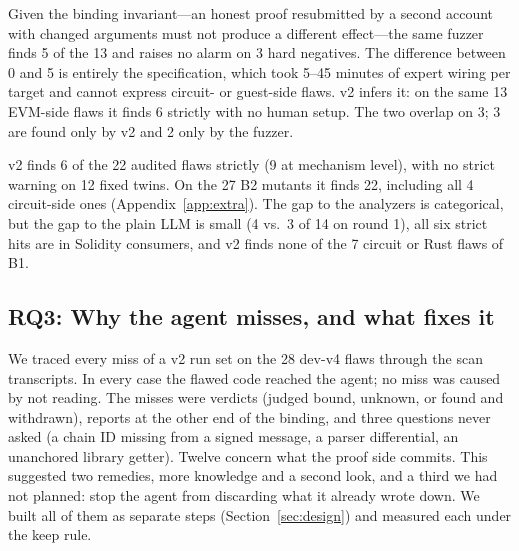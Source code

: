 Given the binding invariant---an honest proof resubmitted by a second account
with changed arguments must not produce a different effect---the same
fuzzer finds 5 of the 13 and raises no alarm on 3 hard negatives. The
difference between 0 and 5 is entirely the specification, which took 5--45
minutes of expert wiring per target and cannot express circuit- or
guest-side flaws. \tool{} v2 infers it: on the same 13 EVM-side flaws it
finds 6 strictly with no human setup. The two overlap on 3; 3 are found only
by v2 and 2 only by the fuzzer.

v2 finds 6 of the 22 audited flaws strictly (9 at mechanism level), with no
strict warning on 12 fixed twins. On the 27 B2 mutants it finds 22, including
all 4 circuit-side ones (Appendix~\ref{app:extra}). The gap to the analyzers is
categorical, but the gap to the plain LLM is small (4 vs.\ 3 of 14 on round
1), all six strict hits are in Solidity consumers, and v2 finds none of the 7
circuit or Rust flaws of B1.


\subsection{RQ3: Why the agent misses, and what fixes it}\label{sec:eval-anatomy}

We traced every miss of a v2 run set on the 28 dev-v4 flaws through the scan
transcripts. In every case the flawed code reached the agent; no miss was
caused by not reading. The misses were verdicts (judged bound, unknown, or
found and withdrawn), reports at the other end of the binding, and three
questions never asked (a chain ID missing from a signed message, a parser
differential, an unanchored library getter). Twelve concern what the proof
side commits. This suggested two remedies, more knowledge and a second look,
and a third we had not planned: stop the agent from discarding what it
already wrote down. We built all of them as separate steps
(Section~\ref{sec:design}) and measured each under the keep rule.

